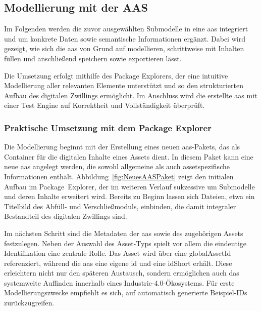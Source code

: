 \subsection{Modellierung mit der AAS}

Im Folgenden werden die zuvor ausgewählten Submodelle in eine \acs{aas} integriert und um konkrete Daten sowie semantische Informationen ergänzt.
Dabei wird gezeigt, wie sich die \acs{aas} von Grund auf modellieren, schrittweise mit Inhalten füllen und anschließend speichern sowie exportieren lässt.

Die Umsetzung erfolgt mithilfe des Package Explorers, der eine intuitive Modellierung aller relevanten Elemente unterstützt und so den strukturierten Aufbau des digitalen Zwillings ermöglicht.
Im Anschluss wird die erstellte \acs{aas} mit einer Test Engine auf Korrektheit und Vollständigkeit überprüft.

\subsubsection{Praktische Umsetzung mit dem Package Explorer}

Die Modellierung beginnt mit der Erstellung eines neuen \acs{aas}-Pakets, das als \mbox{Container} für die digitalen Inhalte eines Assets dient.
In diesem Paket kann eine neue \acs{aas} angelegt werden, die sowohl allgemeine als auch assetspezifische Informationen enthält.
Abbildung~\ref{fig:NeuesAASPaket} zeigt den initialen Aufbau im \mbox{Package Explorer}, der im weiteren Verlauf sukzessive um Submodelle und deren Inhalte erweitert wird.
Bereits zu Beginn lassen sich Dateien, etwa ein Titelbild des Abfüll- und Verschließmoduls, einbinden, die damit integraler Bestandteil des digitalen Zwillings sind.

Im nächsten Schritt sind die Metadaten der \acs{aas} sowie des zugehörigen Assets festzulegen.
Neben der Auswahl des Asset-Typs spielt vor allem die eindeutige Identifikation eine zentrale Rolle.
Das Asset wird über eine globalAssetId referenziert, während die \acs{aas} eine eigene \acs{id} und eine idShort erhält.
Diese erleichtern nicht nur den späteren Austausch, sondern ermöglichen auch das systemweite Auffinden innerhalb eines Industrie-4.0-Ökosystems.
Für erste Modellierungszwecke empfiehlt es sich, auf automatisch generierte Beispiel-IDs zurückzugreifen.

